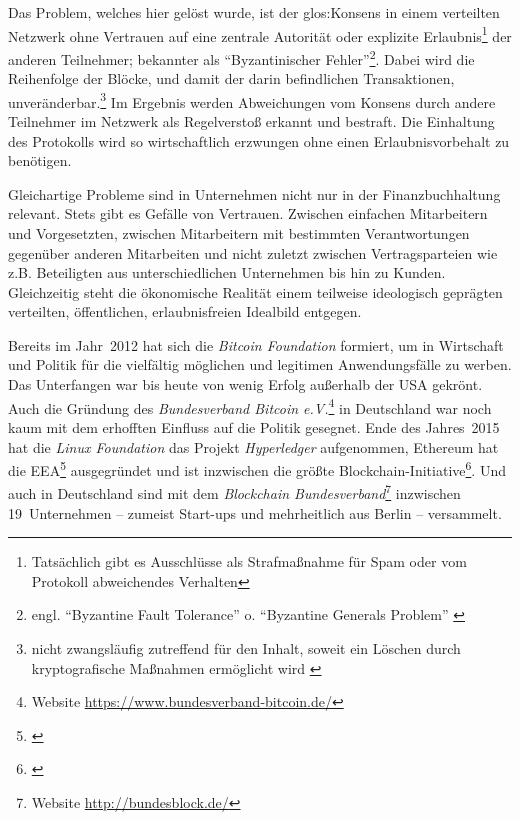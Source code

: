 Das Problem, welches hier gelöst wurde, ist der \gls{glos:Konsens} in einem verteilten Netzwerk ohne Vertrauen auf eine zentrale Autorität oder explizite Erlaubnis\footnote{Tatsächlich gibt es Ausschlüsse als Strafmaßnahme für Spam oder vom Protokoll abweichendes Verhalten} der anderen Teilnehmer; bekannter als \enquote{Byzantinischer Fehler}\footnote{engl. \enquote{Byzantine Fault Tolerance} o. \enquote{Byzantine Generals Problem} \autocite{p:byzantine-original}}.
Dabei wird die Reihenfolge der Blöcke, und damit der darin befindlichen Transaktionen, unveränderbar.\footnote{nicht zwangsläufig zutreffend für den Inhalt, soweit ein Löschen durch kryptografische Maßnahmen ermöglicht wird \autocite{w:accenture-patent}}
Im Ergebnis werden Abweichungen vom Konsens durch andere Teilnehmer im Netzwerk als Regelverstoß erkannt und bestraft.
Die Einhaltung des Protokolls wird so wirtschaftlich erzwungen ohne einen Erlaubnisvorbehalt zu benötigen.


Gleichartige Probleme sind in Unternehmen nicht nur in der Finanzbuchhaltung relevant.
Stets gibt es Gefälle von Vertrauen.
Zwischen
einfachen Mitarbeitern und Vorgesetzten,
zwischen Mitarbeitern mit bestimmten Verantwortungen gegenüber anderen Mitarbeiten
und nicht zuletzt
zwischen Vertragsparteien wie z.B. Beteiligten aus unterschiedlichen Unternehmen bis hin zu Kunden.
Gleichzeitig steht die ökonomische Realität einem teilweise ideologisch geprägten verteilten, öffentlichen, erlaubnisfreien Idealbild entgegen.


Bereits im Jahr~2012 hat sich die \emph{Bitcoin Foundation} formiert, um in Wirtschaft und Politik für die vielfältig möglichen und legitimen Anwendungsfälle zu werben.
Das Unterfangen war bis heute von wenig Erfolg außerhalb der USA gekrönt.
Auch die Gründung des \emph{Bundesverband Bitcoin e.V.}\footnote{Website \url{https://www.bundesverband-bitcoin.de/}} in Deutschland war noch kaum mit dem erhofften Einfluss auf die Politik gesegnet.
Ende des Jahres~2015 hat die \emph{Linux Foundation} das Projekt \emph{Hyperledger} aufgenommen, Ethereum hat die \gls{EEA}\footnote{%
\cite{p:eea}} ausgegründet und ist inzwischen die größte Blockchain-Initiative\footnote{\cite{w:eea:launch}}.
Und auch in Deutschland sind mit dem \emph{Blockchain Bundesverband}\footnote{Website \url{http://bundesblock.de/}} inzwischen 19~Unternehmen -- zumeist Start-ups und mehrheitlich aus Berlin -- versammelt.

